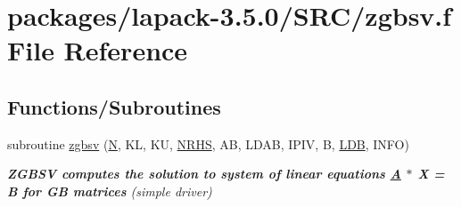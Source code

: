 \hypertarget{zgbsv_8f}{}\section{packages/lapack-\/3.5.0/\+S\+R\+C/zgbsv.f File Reference}
\label{zgbsv_8f}
\subsection*{Functions/\+Subroutines}
\begin{DoxyCompactItemize}
\item 
subroutine \hyperlink{group__complex16GBsolve_ga908abc0aad64131b9a32edb08510eb00}{zgbsv} (\hyperlink{polmisc_8c_a0240ac851181b84ac374872dc5434ee4}{N}, K\+L, K\+U, \hyperlink{example__user_8c_aa0138da002ce2a90360df2f521eb3198}{N\+R\+H\+S}, A\+B, L\+D\+A\+B, I\+P\+I\+V, B, \hyperlink{example__user_8c_a50e90a7104df172b5a89a06c47fcca04}{L\+D\+B}, I\+N\+F\+O)
\begin{DoxyCompactList}\small\item\em {\bfseries  Z\+G\+B\+S\+V computes the solution to system of linear equations \hyperlink{classA}{A} $\ast$ X = B for G\+B matrices} (simple driver) \end{DoxyCompactList}\end{DoxyCompactItemize}
